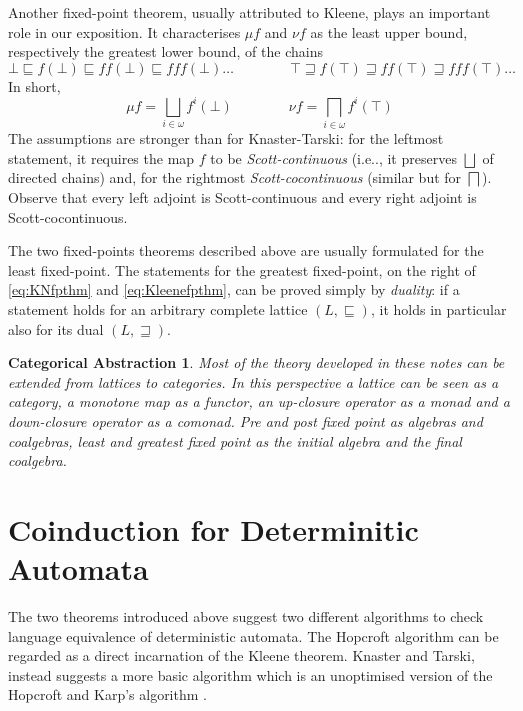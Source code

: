\documentclass[smallcondensed,envcountsect,envcountsame]{svjour3}     %
\newtheorem{CA}[theorem]{Categorical Abstraction}
\begin{document}
Another fixed-point theorem, usually attributed to Kleene, plays an important role in our exposition. It characterises $\mu f$ and $\nu f$ as the least upper bound, respectively the greatest lower bound, of the chains
\begin{equation}\label{eq:initfinsequences}
\bot \sqsubseteq f(\bot) \sqsubseteq ff(\bot) \sqsubseteq fff(\bot) \dots \qquad \qquad \top \sqsupseteq f(\top) \sqsupseteq ff(\top)  \sqsupseteq fff(\top) \dots 
\end{equation}
In short, 
\begin{equation}\label{eq:Kleenefpthm}
\mu f = \bigsqcup_{i\in \omega} f^i(\bot) \qquad \qquad \nu f = \bigsqcap_{i\in \omega} f^i(\top)
\end{equation}
The assumptions are stronger than for Knaster-Tarski: for the leftmost statement, it requires the map $f$ to be \emph{Scott-continuous} (i.e.., it preserves $\bigsqcup$ of directed chains) and, for the rightmost  \emph{Scott-cocontinuous} (similar but for  $\bigsqcap$). Observe that every left adjoint is Scott-continuous and every right adjoint is Scott-cocontinuous.
%
\begin{remark}[Duality]
The two fixed-points theorems described above are usually formulated for the least fixed-point. The statements for the greatest fixed-point, on the right of \eqref{eq:KNfpthm} and \eqref{eq:Kleenefpthm}, can be proved simply by \emph{duality}: if a statement holds for an arbitrary complete lattice $(L, \sqsubseteq)$, it holds in particular also for its dual $(L, \sqsupseteq)$. 
\end{remark}

\begin{CA}
Most of the theory developed in these notes can be extended from lattices to categories. In this perspective a lattice can be seen as a category, a monotone map as a functor, an up-closure operator as a monad and a down-closure operator as a comonad. Pre and post fixed point as algebras and coalgebras, least and greatest fixed point as the initial algebra and the final coalgebra. 
\end{CA}



\section{Coinduction for Determinitic Automata}\label{sec:DA}
The two theorems introduced above suggest two different algorithms to check language equivalence of deterministic automata. 
The Hopcroft algorithm \cite{} can be regarded as a direct incarnation of the Kleene theorem. Knaster and Tarski, instead suggests a more basic algorithm which is an unoptimised version of the Hopcroft and Karp's algorithm \cite{}.
\medskip
\end{document}
